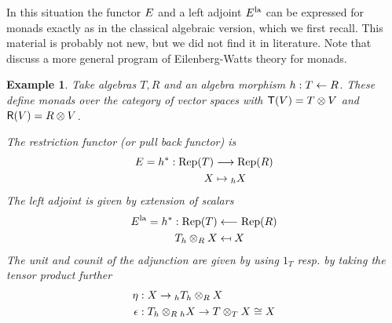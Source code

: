 \documentclass[a4paper, reqno]{amsart}
\newtheorem{example}[theorem]{Example}
\theoremstyle{introTheorems}
\newcommand\Rep{\textup{Rep}}
\renewcommand{\1}{\mathbbold{1}}
\begin{document}
In this situation the functor $E$ and a left adjoint $E^{\mathrm{la}}$ can be expressed for monads exactly as in the classical algebraic version, which we first recall. This material is probably not new, but we did not find it in literature. Note that \cite{SZ24} discuss a more general program of Eilenberg-Watts theory for monads.


\begin{example}\label{exm_rings}
 Take algebras $T,R$ and an algebra morphism $h:T\leftarrow R$. These define monads over the category of vector spaces with ${\mathsf{T}}(V)=T\otimes V$ and ${\mathsf{R}}(V)=R\otimes V$. 
 
 \bigskip
 
 The restriction functor  (or pull back functor) is  
    \begin{align*}
        \funE=\fpullback^*:\Rep(T)&\longrightarrow \Rep(R)\\
        X&\mapsto {_\fpullback}X 
    \end{align*}
    The left adjoint is given by extension of scalars 
    \begin{align*}
    \funE^\la=\fpullback^*:\Rep(T)&\longleftarrow \Rep(R)\\
    T_\fpullback\otimes_R X&\mapsfrom X
    \end{align*}
   The unit and counit of the adjunction are given by using $1_T$ resp. by taking the tensor product further 
   \begin{align*}
       \eta:\;&X \to {_h}T_h\otimes_R X\\
    \epsilon:\; &T_h\otimes_R {_h}X \to T\otimes_T X\cong X
   \end{align*}
\end{example}
\end{document}
